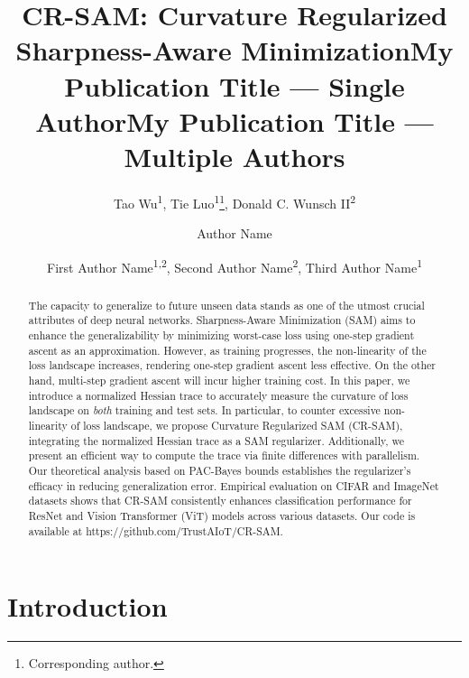 \documentclass[letterpaper]{article} %
\title{CR-SAM: Curvature Regularized Sharpness-Aware Minimization}
\author{
    Tao Wu\textsuperscript{\rm 1},
    Tie Luo\textsuperscript{\rm 1}\thanks{Corresponding author.}, 
    Donald C. Wunsch II\textsuperscript{\rm 2}
}
\title{My Publication Title --- Single Author}
\author {
    Author Name
}
\title{My Publication Title --- Multiple Authors}
\author {
    First Author Name\textsuperscript{\rm 1,\rm 2},
    Second Author Name\textsuperscript{\rm 2},
    Third Author Name\textsuperscript{\rm 1}
}
\theoremstyle{plain}
\theoremstyle{definition}
\begin{document}
\maketitle

\begin{abstract}
The capacity to generalize to future unseen data stands as one of the utmost crucial attributes of deep neural networks. Sharpness-Aware Minimization (SAM) aims to enhance the generalizability by minimizing worst-case loss using one-step gradient ascent as an approximation. However, as training progresses, the non-linearity of the loss landscape increases, rendering one-step gradient ascent less effective. On the other hand, multi-step gradient ascent will incur higher training cost. In this paper, we introduce a normalized Hessian trace to accurately measure the curvature of loss landscape on {\em both} training and test sets. In particular, to counter excessive non-linearity of loss landscape, we propose Curvature Regularized SAM (CR-SAM), integrating the normalized Hessian trace as a SAM regularizer. Additionally, we present an efficient way to compute the trace via finite differences with parallelism. Our theoretical analysis based on PAC-Bayes bounds establishes the regularizer's efficacy in reducing generalization error. Empirical evaluation on CIFAR and ImageNet datasets shows that CR-SAM consistently enhances classification performance for ResNet and Vision Transformer (ViT) models across various datasets. Our code is available at https://github.com/TrustAIoT/CR-SAM.
\end{abstract}

\section{Introduction}
\label{sec:Introduction}
\end{document}
